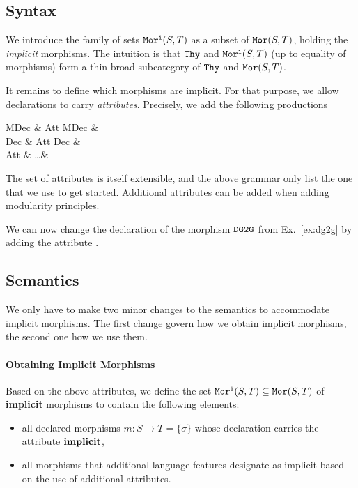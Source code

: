 
\subsection{Syntax}

We introduce the family of sets $\mathtt{Mor^i}(S,T)$ as a subset of $\mathtt{Mor}(S,T)$, holding the \textit{implicit} morphisms.
The intuition is that $\mathtt{Thy}$ and $\mathtt{Mor^i}(S,T)$ (up to equality of morphisms) form a thin broad subcategory of $\mathtt{Thy}$ and $\mathtt{Mor}(S,T)$.

It remains to define which morphisms are implicit.
For that purpose, we allow \mmt declarations to carry \textit{attributes}.
Precisely, we add the following productions
\begin{grammar}
MDec   & Att\; MDec  &  \\
Dec    & Att\; Dec   & \\
Att    &  \alt \ldots & 
\end{grammar}

The set of attributes is itself extensible, and the above grammar only list the one that we use to get started.
Additional attributes can be added when adding modularity principles.

\begin{example}\label{ex:dg2gimplicit}
We can now change the declaration of the morphism $\operatorname{\mathtt{DG2G}}$ from Ex.~\ref{ex:dg2g} by adding the attribute .
\end{example}

\subsection{Semantics}

We only have to make two minor changes to the semantics to accommodate implicit morphisms.
The first change govern how we obtain implicit morphisms, the second one how we use them.

\paragraph{Obtaining Implicit Morphisms}
Based on the above attributes, we define the set $\mathtt{Mor^i}(S,T)\subseteq\mathtt{Mor}(S,T)$ of \textbf{implicit} morphisms to contain the following elements:
\begin{itemize}
 \item all declared morphisms $m:S\to T=\{\sigma\}$ whose declaration carries the attribute $\operatorname{\mathbf{implicit}}$,
 \item all morphisms that additional language features designate as implicit based on the use of additional attributes.
\end{itemize}

